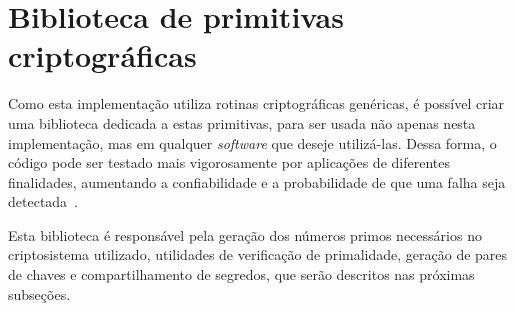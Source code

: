 \section{Biblioteca de primitivas criptográficas}

Como esta implementação utiliza rotinas criptográficas genéricas, é possível
criar uma biblioteca dedicada a estas primitivas, para ser usada não apenas
nesta implementação, mas em qualquer \textit{software} que deseje utilizá-las.
Dessa forma, o código pode ser testado mais vigorosamente por aplicações de
diferentes finalidades, aumentando a confiabilidade e a probabilidade de que
uma falha seja detectada~\cite{hursch1995separation}.

Esta biblioteca é responsável pela geração dos números primos necessários no
criptosistema utilizado, utilidades de verificação de primalidade, geração de
pares de chaves e compartilhamento de segredos, que serão descritos nas
próximas subseções.



